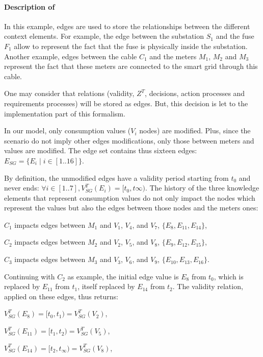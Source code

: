 \paragraph{Description of }

In this example, edges are used to store the relationships between the different context elements.
For example, the edge between the substation $S_1$ and the fuse $F_1$ allow to represent the fact that the fuse is physically inside the substation.
Another example, edges between the cable $C_1$ and the meters $M_1$, $M_2$ and $M_3$ represent the fact that these meters are connected to the smart grid through this cable.

One may consider that relations (validity, $Z^T$, decisions, action processes and requirements processes) will be stored as edges.
But, this decision is let to the implementation part of this formalism.

In our model, only consumption values ($V_i$ nodes) are modified.
Plus, since the scenario do not imply other edges modifications, only those between meters and values are modified.
The edge set contains thus sixteen edges: $E_{SG} = \{E_i \mid i \in [1..16] \}$.

By definition, the unmodified edges have a validity period starting from $t_0$ and never ends: $\forall i \in [1..7], V^T_{SG}(E_i) = [t_0, t\infty)$.
The history of the three knowledge elements that represent consumption values do not only impact the nodes which represent the values but also the edges between those nodes and the meters ones:
\begin{condItemize}
	\item $C_1$ impacts edges between $M_1$ and $V_1$, $V_4$, and $V_7$, \ie $\{E_8, E_{11}, E_{14}\}$,
	\item $C_2$ impacts edges between $M_2$ and $V_2$, $V_5$, and $V_8$, \ie $\{E_9, E_{12}, E_{15}\}$,
	\item $C_3$ impacts edges between $M_3$ and $V_3$, $V_6$, and $V_9$, \ie $\{E_{10}, E_{13}, E_{16}\}$.
\end{condItemize}

Continuing with $C_2$ as example, the initial edge value is $E_8$ from $t_0$, which is replaced by $E_{11}$ from $t_1$, itself replaced by $E_{14}$ from $t_2$.
The validity relation, applied on these edges, thus returns:
\begin{condItemize}
	\item $V^T_{SG}(E_8) = [t_0, t_1) = V^T_{SG}(V_2)$,
	\item $V^T_{SG}(E_{11}) = [t_1, t_2) = V^T_{SG}(V_5)$,
	\item $V^T_{SG}(E_{14}) = [t_2, t_\infty) = V^T_{SG}(V_8)$,
\end{condItemize}

